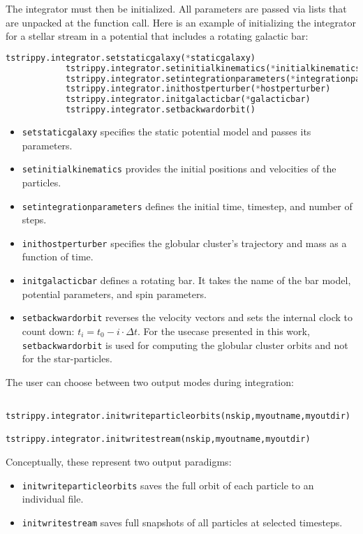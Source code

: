 \documentclass{article}
\begin{document}
        The integrator must then be initialized. All parameters are passed via lists that are unpacked at the function call. Here is an example of initializing the integrator for a stellar stream in a potential that includes a rotating galactic bar:
        \small
        \begin{lstlisting}[language=python]
            tstrippy.integrator.setstaticgalaxy(*staticgalaxy)
            tstrippy.integrator.setinitialkinematics(*initialkinematics)
            tstrippy.integrator.setintegrationparameters(*integrationparameters)
            tstrippy.integrator.inithostperturber(*hostperturber)
            tstrippy.integrator.initgalacticbar(*galacticbar)
            tstrippy.integrator.setbackwardorbit()
        \end{lstlisting}
        \normalsize

        \begin{itemize}
            \item \texttt{setstaticgalaxy} specifies the static potential model and passes its parameters.
            \item \texttt{setinitialkinematics} provides the initial positions and velocities of the particles.
            \item \texttt{setintegrationparameters} defines the initial time, timestep, and number of steps.
            \item \texttt{inithostperturber} specifies the globular cluster’s trajectory and mass as a function of time.
            \item \texttt{initgalacticbar} defines a rotating bar. It takes the name of the bar model, potential parameters, and spin parameters.
            \item \texttt{setbackwardorbit} reverses the velocity vectors and sets the internal clock to count down: $t_i = t_0 - i \cdot \Delta t$. For the usecase presented in this work, \texttt{setbackwardorbit} is used for computing the globular cluster orbits and not for the star-particles. 
        \end{itemize}

        The user can choose between two output modes during integration:
        \begin{lstlisting}
            tstrippy.integrator.initwriteparticleorbits(nskip,myoutname,myoutdir)
            tstrippy.integrator.initwritestream(nskip,myoutname,myoutdir)
        \end{lstlisting}
        Conceptually, these represent two output paradigms:
        \begin{itemize}
            \item \texttt{initwriteparticleorbits} saves the full orbit of each particle to an individual file.
            \item \texttt{initwritestream} saves full snapshots of all particles at selected timesteps.
        \end{itemize}
\end{document}
